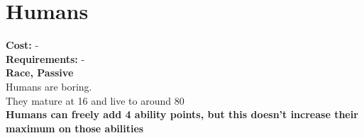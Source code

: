 \section{Humans}
\textbf{Cost:} -\\
\textbf{Requirements:} -\\
\textbf{Race, Passive}\\
Humans are boring.\\
They mature at 16 and live to around 80\\
\textbf{Humans can freely add 4 ability points, but this doesn't increase their maximum on those abilities}
